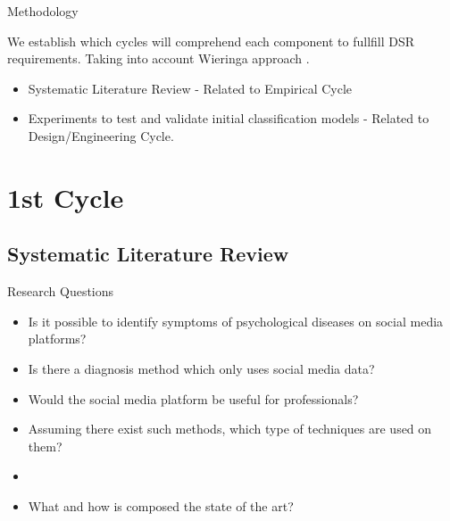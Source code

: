 \documentclass[aspectratio=169,10pt,xcolor={dvipsnames}]{beamer}
\begin{document}
\begin{frame}{Methodology}
  \begin{block}{}
    We establish which cycles will comprehend each component to fullfill DSR requirements. Taking into account Wieringa approach \cite{Wieringa2014}.

    \begin{itemize}
      \item Systematic Literature Review - Related to Empirical Cycle
      \item Experiments to test and validate initial classification models - Related to Design/Engineering Cycle.
    \end{itemize}
  \end{block}
\end{frame}

\section{1st Cycle}
\subsection{Systematic Literature Review}

\begin{frame}{Research Questions}
  \begin{itemize}
    \item Is it possible to identify symptoms of psychological diseases on social media platforms? %
    \item Is there a diagnosis method which only uses social media data? %
    \item Would the social media platform be useful for professionals? %
    \item Assuming there exist such methods, which type of techniques are used on them? %
    \item %
    \item What and how is composed the state of the art? %
  \end{itemize}
\end{frame}
\end{document}
